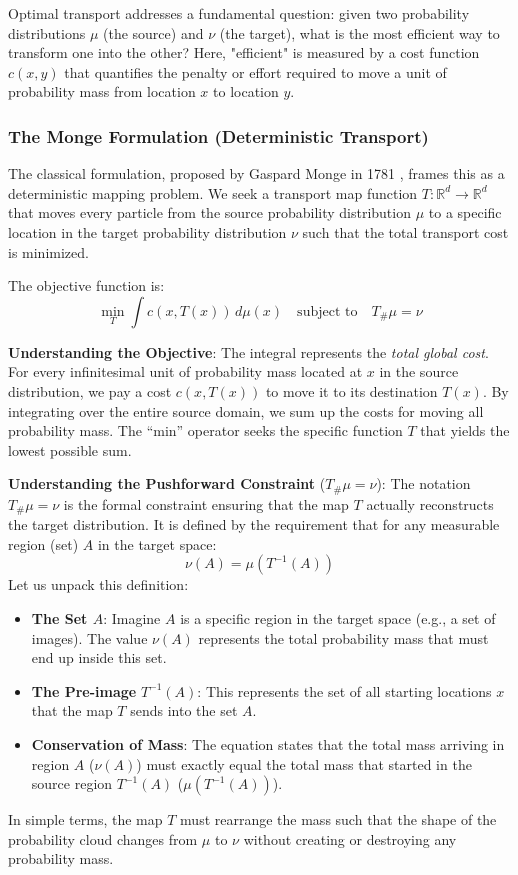 \documentclass{book}
\begin{document}
Optimal transport addresses a fundamental question: given two probability distributions $\mu$ (the source) and $\nu$ (the target), what is the most efficient way to transform one into the other? Here, "efficient" is measured by a cost function $c(x, y)$ that quantifies the penalty or effort required to move a unit of probability mass from location $x$ to location $y$.

\subsubsection{The Monge Formulation (Deterministic Transport)}
The classical formulation, proposed by Gaspard Monge in 1781 \cite{monge1781memoire}, frames this as a deterministic mapping problem. We seek a transport map function $T: \mathbb{R}^d \to \mathbb{R}^d$ that moves every particle from the source probability distribution $\mu$ to a specific location in the target probability distribution $\nu$ such that the total transport cost is minimized.

The objective function is:
\begin{equation}
\min_{T} \int c(x, T(x)) \, d\mu(x) \quad \text{subject to} \quad T_\# \mu = \nu
\end{equation}

\textbf{Understanding the Objective}:
The integral represents the \textit{total global cost}. For every infinitesimal unit of probability mass located at $x$ in the source distribution, we pay a cost $c(x, T(x))$ to move it to its destination $T(x)$. By integrating over the entire source domain, we sum up the costs for moving all probability mass. The ``min'' operator seeks the specific function $T$ that yields the lowest possible sum.

\textbf{Understanding the Pushforward Constraint} ($T_\# \mu = \nu$):
The notation $T_\# \mu = \nu$ is the formal constraint ensuring that the map $T$ actually reconstructs the target distribution. It is defined by the requirement that for any measurable region (set) $A$ in the target space:
\begin{equation}
\nu(A) = \mu(T^{-1}(A))
\end{equation}
Let us unpack this definition:
\begin{itemize}
    \item \textbf{The Set $A$}: Imagine $A$ is a specific region in the target space (e.g., a set of images). The value $\nu(A)$ represents the total probability mass that must end up inside this set.
    \item \textbf{The Pre-image} $T^{-1}(A)$: This represents the set of all starting locations $x$ that the map $T$ sends into the set $A$.
    \item \textbf{Conservation of Mass}: The equation states that the total mass arriving in region $A$ ($\nu(A)$) must exactly equal the total mass that started in the source region $T^{-1}(A)$ ($\mu(T^{-1}(A))$).
\end{itemize}
In simple terms, the map $T$ must rearrange the mass such that the shape of the probability cloud changes from $\mu$ to $\nu$ without creating or destroying any probability mass.
\end{document}
